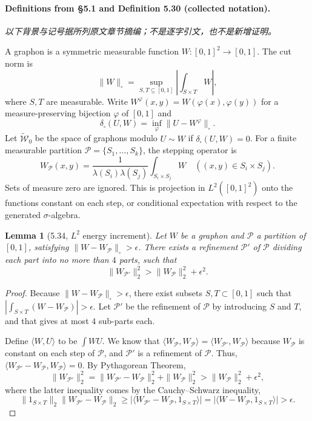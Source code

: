 \documentclass[UTF8,11pt]{ctexart}
\newtheorem*{lemma}{Lemma}
\theoremstyle{definition}
\begin{document}
\paragraph{Definitions from \S5.1 and Definition 5.30 (collected notation).}
\noindent\textit{以下背景与记号据所列原文章节摘编；不是逐字引文，也不是新增证明。}\par
A graphon is a symmetric measurable function $W:[0,1]^2\to[0,1]$. The cut norm is
\[\|W\|_\square=\sup_{S,T\subseteq[0,1]}\left|\int_{S\times T}W\right|,\]
where $S,T$ are measurable. Write $W^\varphi(x,y)=W(\varphi(x),\varphi(y))$ for a measure-preserving bijection $\varphi$ of $[0,1]$ and
\[\delta_\square(U,W)=\inf_\varphi\|U-W^\varphi\|_\square.\]
Let $\widetilde{\mathcal W}_0$ be the space of graphons modulo $U\sim W$ if $\delta_\square(U,W)=0$. For a finite measurable partition $\mathcal P=\{S_1,\ldots,S_k\}$, the stepping operator is
\[W_{\mathcal P}(x,y)=\frac1{\lambda(S_i)\lambda(S_j)}\int_{S_i\times S_j}W\quad ((x,y)\in S_i\times S_j).\]
Sets of measure zero are ignored. This is projection in $L^2([0,1]^2)$ onto the functions constant on each step, or conditional expectation with respect to the generated $\sigma$-algebra.
\begin{lemma}[5.34, $L^2$ energy increment]
Let $W$ be a graphon and $\mathcal P$ a partition of $[0,1]$, satisfying $\|W-W_{\mathcal P}\|_\square>\epsilon$. There exists a refinement $\mathcal P'$ of $\mathcal P$ dividing each part into no more than $4$ parts, such that
\[\|W_{\mathcal P'}\|_2^2>\|W_{\mathcal P}\|_2^2+\epsilon^2.\]
\end{lemma}
\begin{proof}
Because $\|W-W_{\mathcal P}\|_\square>\epsilon$, there exist subsets $S,T\subset[0,1]$ such that $|\int_{S\times T}(W-W_{\mathcal P})|>\epsilon$. Let $\mathcal P'$ be the refinement of $\mathcal P$ by introducing $S$ and $T$, and that gives at most $4$ sub-parts each.

Define $\langle W,U\rangle$ to be $\int WU$. We know that $\langle W_{\mathcal P},W_{\mathcal P}\rangle=\langle W_{\mathcal P'},W_{\mathcal P}\rangle$ because $W_{\mathcal P}$ is constant on each step of $\mathcal P$, and $\mathcal P'$ is a refinement of $\mathcal P$. Thus, $\langle W_{\mathcal P'}-W_{\mathcal P},W_{\mathcal P}\rangle=0$. By Pythagorean Theorem,
\[\|W_{\mathcal P'}\|_2^2=\|W_{\mathcal P'}-W_{\mathcal P}\|_2^2+\|W_{\mathcal P}\|_2^2>\|W_{\mathcal P}\|_2^2+\epsilon^2,\]
where the latter inequality comes by the Cauchy--Schwarz inequality,
\[\|1_{S\times T}\|_2\|W_{\mathcal P'}-W_{\mathcal P}\|_2\geq|\langle W_{\mathcal P'}-W_{\mathcal P},1_{S\times T}\rangle|=|\langle W-W_{\mathcal P},1_{S\times T}\rangle|>\epsilon.\]
\end{proof}
\end{document}
